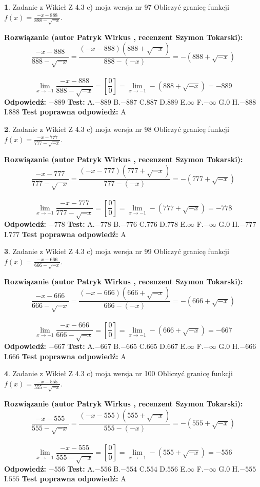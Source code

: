 \documentclass[12pt, a4paper]{article}
\theoremstyle{definition} %
\newtheorem{zad}{}
\newcommand{\zadStart}[1]{\begin{zad}#1\newline}
\newcommand{\zadStop}{\end{zad}}
\newcommand{\rozwStart}[2]{\noindent \textbf{Rozwiązanie (autor #1 , recenzent #2): }\newline}
\newcommand{\rozwStop}{\newline}
\newcommand{\odpStart}{\noindent \textbf{Odpowiedź:}\newline}
\newcommand{\odpStop}{\newline}
\newcommand{\testStart}{\noindent \textbf{Test:}\newline}
\newcommand{\testStop}{\newline}
\newcommand{\kluczStart}{\noindent \textbf{Test poprawna odpowiedź:}\newline}
\newcommand{\kluczStop}{\newline}
\begin{document}
\zadStart{Zadanie z Wikieł Z 4.3 c) moja wersja nr 97}
Obliczyć granicę funkcji $f(x)=\frac{-x-888}{888-\sqrt{-x}}$.
\zadStop
\rozwStart{Patryk Wirkus}{Szymon Tokarski}
$$\frac{-x-888}{888-\sqrt{-x}}=\frac{(-x-888)(888+\sqrt{-x})}{888-(-x)}=-(888+\sqrt{-x})$$
\\
$$\lim\limits_{x\to-1}\frac{-x-888}{888-\sqrt{-x}}=[\frac{0}{0}]=\lim\limits_{x\to-1}-(888+\sqrt{-x}) =-889$$
\rozwStop
\odpStart
$-889$
\odpStop
\testStart
A.$-889$
B.$-887$
C.$887$
D.$889$
E.$\infty$
F.$-\infty$
G.$0$
H.$-888$
I.$888$
\testStop
\kluczStart
A
\kluczStop



\zadStart{Zadanie z Wikieł Z 4.3 c) moja wersja nr 98}
Obliczyć granicę funkcji $f(x)=\frac{-x-777}{777-\sqrt{-x}}$.
\zadStop
\rozwStart{Patryk Wirkus}{Szymon Tokarski}
$$\frac{-x-777}{777-\sqrt{-x}}=\frac{(-x-777)(777+\sqrt{-x})}{777-(-x)}=-(777+\sqrt{-x})$$
\\
$$\lim\limits_{x\to-1}\frac{-x-777}{777-\sqrt{-x}}=[\frac{0}{0}]=\lim\limits_{x\to-1}-(777+\sqrt{-x}) =-778$$
\rozwStop
\odpStart
$-778$
\odpStop
\testStart
A.$-778$
B.$-776$
C.$776$
D.$778$
E.$\infty$
F.$-\infty$
G.$0$
H.$-777$
I.$777$
\testStop
\kluczStart
A
\kluczStop



\zadStart{Zadanie z Wikieł Z 4.3 c) moja wersja nr 99}
Obliczyć granicę funkcji $f(x)=\frac{-x-666}{666-\sqrt{-x}}$.
\zadStop
\rozwStart{Patryk Wirkus}{Szymon Tokarski}
$$\frac{-x-666}{666-\sqrt{-x}}=\frac{(-x-666)(666+\sqrt{-x})}{666-(-x)}=-(666+\sqrt{-x})$$
\\
$$\lim\limits_{x\to-1}\frac{-x-666}{666-\sqrt{-x}}=[\frac{0}{0}]=\lim\limits_{x\to-1}-(666+\sqrt{-x}) =-667$$
\rozwStop
\odpStart
$-667$
\odpStop
\testStart
A.$-667$
B.$-665$
C.$665$
D.$667$
E.$\infty$
F.$-\infty$
G.$0$
H.$-666$
I.$666$
\testStop
\kluczStart
A
\kluczStop



\zadStart{Zadanie z Wikieł Z 4.3 c) moja wersja nr 100}
Obliczyć granicę funkcji $f(x)=\frac{-x-555}{555-\sqrt{-x}}$.
\zadStop
\rozwStart{Patryk Wirkus}{Szymon Tokarski}
$$\frac{-x-555}{555-\sqrt{-x}}=\frac{(-x-555)(555+\sqrt{-x})}{555-(-x)}=-(555+\sqrt{-x})$$
\\
$$\lim\limits_{x\to-1}\frac{-x-555}{555-\sqrt{-x}}=[\frac{0}{0}]=\lim\limits_{x\to-1}-(555+\sqrt{-x}) =-556$$
\rozwStop
\odpStart
$-556$
\odpStop
\testStart
A.$-556$
B.$-554$
C.$554$
D.$556$
E.$\infty$
F.$-\infty$
G.$0$
H.$-555$
I.$555$
\testStop
\kluczStart
A
\kluczStop
\end{document}
